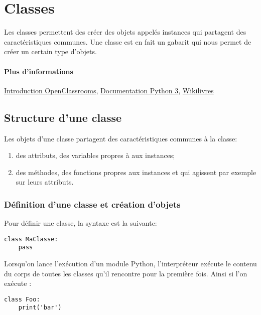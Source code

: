 \section{Classes}

Les classes permettent des créer des objets appelés instances qui partagent des caractéristiques communes. Une classe est en fait un gabarit qui nous permet de créer un certain type d'objets.

\paragraph{Plus d'informations} \href{https://openclassrooms.com/courses/apprenez-a-programmer-en-python/premiere-approche-des-classes}{Introduction OpenClassrooms}, \href{https://docs.python.org/fr/3/tutorial/classes.html}{Documentation Python 3}, \href{https://fr.wikibooks.org/wiki/Programmation_Python/Classes#Définition_d'une_classe_élé mentaire}{Wikilivres}

\subsection{Structure d'une classe}
Les objets d'une classe partagent des caractéristiques communes à la classe:
\begin{enumerate}
	\item des attributs, des variables propres à aux instances;
	\item des méthodes, des fonctions propres aux instances et qui agissent par exemple sur leurs attributs.
\end{enumerate}


\subsubsection{Définition d'une classe et création d'objets}
Pour définir une classe, la syntaxe est la suivante:
\begin{verbatim}
class MaClasse:
    pass
\end{verbatim}

Lorsqu'on lance l'exécution d'un module Python, l'interpréteur exécute le contenu du corps de toutes les classes qu'il rencontre pour la première fois. Ainsi si l'on exécute :

\begin{verbatim}
class Foo:
    print('bar')
\end{verbatim}

